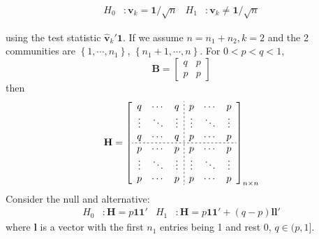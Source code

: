 \documentclass[twoside]{article}
\begin{document}
\begin{align*}
    H_0 &: \mathbf{v}_k = \mathbf{1}/\sqrt{n} & H_1 &: \mathbf{v}_k  \neq \mathbf{1}/\sqrt{n}
\end{align*}

using the test statistic $\hat{\mathbf{v}}_k'\mathbf{1}$.  If we assume $n=n_1 + n_2,k=2$ and the 2 communities are $\left\{1,\cdots,n_1\right\}$, $\left\{n_1+1,\cdots,n\right\}$. For $0<p<q<1$,
$$
\mathbf{B} = \begin{bmatrix}
    q & p \\
    p & p
\end{bmatrix}
$$
then 
$$
\mathbf{H} = \left[
    \begin{array}{ccc;{2pt/2pt}ccc}
        q & \cdots & q & p & \cdots & p \\ 
        \vdots & \ddots & \vdots & \vdots & \ddots & \vdots \\
        q & \cdots & q & p & \cdots & p \\ \hdashline[2pt/2pt]
        p & \cdots & p & p & \cdots & p \\
        \vdots & \ddots & \vdots & \vdots & \ddots & \vdots \\
        p & \cdots & p & p & \cdots & p
    \end{array}
\right]_{n\times n}
$$
Consider the null and alternative:
\begin{align*}
    H_0 &: \mathbf{H} = p\mathbf{11}' & H_1 &: \mathbf{H} = p\mathbf{11}' + (q-p)\mathbf{ll}'
\end{align*}
where $\mathbf{l}$ is a vector with the first $n_1$ entries being 1 and rest 0, $q\in (p,1]$.

\newpage


\end{document}
